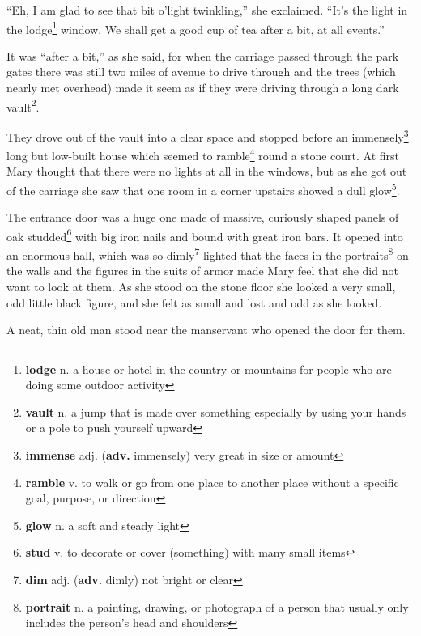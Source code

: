 ``Eh, I am glad to see that bit o'light twinkling,'' she exclaimed. ``It's the light in the lodge\footnote{\textbf{lodge} n. a house or hotel in the country or mountains for people who are doing some outdoor activity} window. We shall get a good cup of tea after a bit, at all events.''

It was ``after a bit,'' as she said, for when the carriage passed through the park gates there was still two miles of avenue to drive through and the trees (which nearly met overhead) made it seem as if they were driving through a long dark vault\footnote{\textbf{vault} n. a jump that is made over something especially by using your hands or a pole to push yourself upward}.

They drove out of the vault into a clear space and stopped before an immensely\footnote{\textbf{immense} adj. (\textbf{adv.} immensely) very great in size or amount} long but low-built house which seemed to ramble\footnote{\textbf{ramble} v. to walk or go from one place to another place without a specific goal, purpose, or direction} round a stone court. At first Mary thought that there were no lights at all in the windows, but as she got out of the carriage she saw that one room in a corner upstairs showed a dull glow\footnote{\textbf{glow} n. a soft and steady light}.

The entrance door was a huge one made of massive, curiously shaped panels of oak studded\footnote{\textbf{stud} v. to decorate or cover (something) with many small items} with big iron nails and bound with great iron bars. It opened into an enormous hall, which was so dimly\footnote{\textbf{dim} adj. (\textbf{adv.} dimly) not bright or clear} lighted that the faces in the portraits\footnote{\textbf{portrait} n. a painting, drawing, or photograph of a person that usually only includes the person's head and shoulders} on the walls and the figures in the suits of armor made Mary feel that she did not want to look at them. As she stood on the stone floor she looked a very small, odd little black figure, and she felt as small and lost and odd as she looked.

A neat, thin old man stood near the manservant who opened the door for them.
